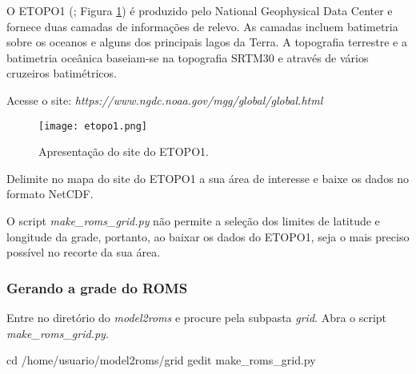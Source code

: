 \noindent O ETOPO1 (\cite{Amante2009}; Figura \textcolor{bleu_cite}{\ref{etopo1}}) é produzido pelo National Geophysical Data Center e fornece duas camadas de informações de relevo. As camadas incluem batimetria sobre os oceanos e alguns dos principais lagos da Terra. A topografia terrestre e a batimetria oceânica baseiam-se na topografia SRTM30 e através de vários cruzeiros batimétricos. 
\bigskip

\noindent Acesse o site: \textcolor{bleu_cite}{\textit{https://www.ngdc.noaa.gov/mgg/global/global.html}}
\bigskip
   
\begin{figure}[H]
    \centering
    \captionsetup{justification=centering}
    \texttt{[image: etopo1.png]}
    \caption{Apresentação do site do ETOPO1.}
    \label{etopo1}
\end{figure}
\bigskip

\noindent Delimite no mapa do site do ETOPO1 a sua área de interesse e baixe os dados no formato NetCDF. 
\bigskip

\begin{tcolorbox}[enhanced,
    grow to left by   = 0cm,
    grow to right by  = 0cm,
    enlarge top by    = 0cm,
    enlarge bottom by = 0cm,
    tcbox raise base,
    boxrule           = 1.0pt,
    left              = 18mm,
    colframe          = red!50!black,coltext=red!25!black,colback=red!10!white,
    overlay           = {\begin{tcbclipinterior}\fill[red!75!blue!50!white] (frame.south west)
      rectangle node[text=white,font=\sffamily\bfseries\footnotesize,rotate=0] {ATENÇÃO} ([xshift=18mm]frame.north west);\end{tcbclipinterior}}]
  O script \textit{make\_roms\_grid.py} não permite a seleção dos limites de latitude e longitude da grade, portanto, ao baixar os dados do ETOPO1, seja o mais preciso possível no recorte da sua área.
\end{tcolorbox}
\bigskip

\subsubsection{Gerando a grade do ROMS}

\noindent Entre no diretório do \textit{model2roms} e procure pela subpasta \textit{grid}. Abra o script \textit{make\_roms\_grid.py}.
\bigskip

\begin{bashcode}
cd /home/usuario/model2roms/grid
gedit make_roms_grid.py
\end{bashcode}
\bigskip

